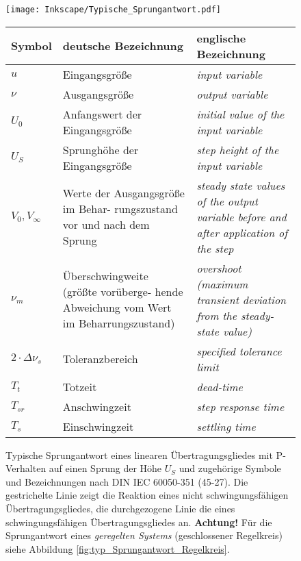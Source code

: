 \begin{figure}[ht]
    \begin{center}
        \texttt{[image: Inkscape/Typische\_Sprungantwort.pdf]}
        \begin{small}
            \begin{tabular}{|l| p{6.4cm}| p{6.4cm}|} \hline
                \rowcolor{lightgray}\textbf{Symbol} &\textbf{deutsche Bezeichnung} &\textbf{englische Bezeichnung} \\ \hline
                $u$ & Eingangsgröße & \textit{input variable}\\
                $\nu$ & Ausgangsgröße & \textit{output variable}\\
                $U_0$ & Anfangswert der Eingangsgröße & \textit{initial value of the input variable}\\
                $U_S$ & Sprunghöhe der Eingangsgröße & \textit{step height of the input variable}\\
                $V_0, V_{\infty}$ & \raggedright Werte der Ausgangsgröße im Behar- rungszustand vor und nach dem Sprung & \textit{steady state values of the output variable before and after application of the step}\\
                $\nu_m$ & \raggedright Überschwingweite (größte vorüberge- hende Abweichung vom Wert im Beharrungszustand) & \textit{overshoot (maximum transient deviation from the steady-state value)}\\
                $2\cdot\Delta\nu_{s}$ & Toleranzbereich & \textit{specified tolerance limit}\\
                $T_t$ & Totzeit & \textit{dead-time}\\
                $T_{sr}$ & Anschwingzeit & \textit{step response time}\\
                $T_s$ & Einschwingzeit & \textit{settling time}\\\hline
            \end{tabular}
        \end{small}
    \end{center}
\caption{Typische Sprungantwort eines linearen Übertragungsgliedes mit P-Verhalten auf einen Sprung der Höhe $U_S$ und zugehörige Symbole und Bezeichnungen nach DIN IEC 60050-351 (45-27). Die gestrichelte Linie zeigt die Reaktion eines nicht schwingungsfähigen Übertragungsgliedes, die durchgezogene Linie die eines schwingungsfähigen Übertragungsgliedes an. \textbf{Achtung!} Für die Sprungantwort eines \emph{geregelten Systems} (geschlossener Regelkreis) siehe Abbildung \ref{fig:typ_Sprungantwort_Regelkreis}.}
\label{fig:typ_Sprungantwort}
\end{figure}

